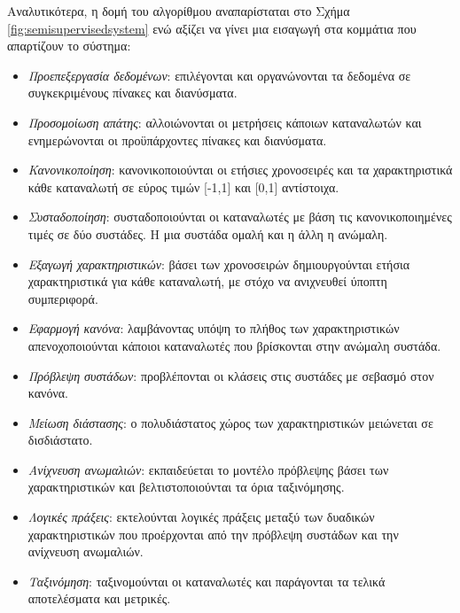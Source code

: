 Αναλυτικότερα, η δομή του αλγορίθμου αναπαρίσταται στο Σχήμα \ref{fig:semisupervisedsystem} ενώ αξίζει να γίνει μια εισαγωγή στα κομμάτια που απαρτίζουν το σύστημα:
\begin{itemize}
\item \textit{Προεπεξεργασία δεδομένων}: επιλέγονται και οργανώνονται τα δεδομένα σε συγκεκριμένους πίνακες και διανύσματα.
\item \textit{Προσομοίωση απάτης}: αλλοιώνονται οι μετρήσεις κάποιων καταναλωτών και ενημερώνονται οι προϋπάρχοντες πίνακες και διανύσματα.
\item \textit{Κανονικοποίηση}: κανονικοποιούνται οι ετήσιες χρονοσειρές και τα χαρακτηριστικά κάθε καταναλωτή σε εύρος τιμών [-1,1] και [0,1] αντίστοιχα.
\item \textit{Συσταδοποίηση}: συσταδοποιούνται οι καταναλωτές με βάση τις κανονικοποιημένες τιμές σε δύο συστάδες. Η μια συστάδα ομαλή και η άλλη η ανώμαλη. 
\item \textit{Εξαγωγή χαρακτηριστικών}: βάσει των χρονοσειρών δημιουργούνται ετήσια χαρακτηριστικά για κάθε καταναλωτή, με στόχο να ανιχνευθεί ύποπτη συμπεριφορά.
\item \textit{Εφαρμογή κανόνα}: λαμβάνοντας υπόψη το πλήθος των χαρακτηριστικών απενοχοποιούνται κάποιοι καταναλωτές που βρίσκονται στην ανώμαλη συστάδα.
\item \textit{Πρόβλεψη συστάδων}: προβλέπονται οι κλάσεις στις συστάδες με σεβασμό στον κανόνα.
\item \textit{Μείωση διάστασης}: ο πολυδιάστατος χώρος των χαρακτηριστικών μειώνεται σε δισδιάστατο.
\item \textit{Ανίχνευση ανωμαλιών}: εκπαιδεύεται το μοντέλο πρόβλεψης βάσει των χαρακτηριστικών και βελτιστοποιούνται τα όρια ταξινόμησης.
\item \textit{Λογικές πράξεις}: εκτελούνται λογικές πράξεις μεταξύ των δυαδικών χαρακτηριστικών που προέρχονται από την πρόβλεψη συστάδων και την ανίχνευση ανωμαλιών.
\item \textit{Ταξινόμηση}: ταξινομούνται οι καταναλωτές και παράγονται τα τελικά αποτελέσματα και μετρικές.
\end{itemize}

